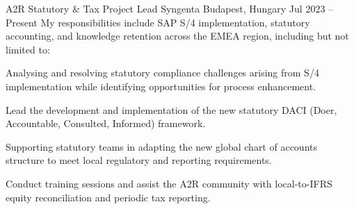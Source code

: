 


\begin{cventries}


  \cventry
    {A2R Statutory \& Tax Project Lead} %
    {Syngenta} %
    {Budapest, Hungary} %
    {Jul 2023 -- Present} %
    {My responsibilities include SAP S/4 implementation, statutory accounting, and knowledge retention across the EMEA region, including but not limited to:} %
    {
      \begin{cvitems} %
        \item {Analysing and resolving statutory compliance challenges arising from S/4 implementation while identifying opportunities for process enhancement.}
        \item {Lead the development and implementation of the new statutory DACI (Doer, Accountable, Consulted, Informed) framework.}
        \item {Supporting statutory teams in adapting the new global chart of accounts structure to meet local regulatory and reporting requirements.}
        \item {Conduct training sessions and assist the A2R community with local-to-IFRS equity reconciliation and periodic tax reporting.}
      \end{cvitems}
    }



\end{cventries}
